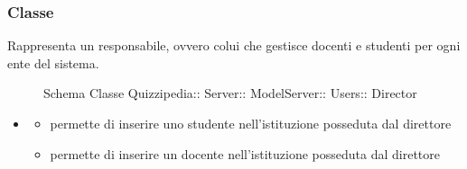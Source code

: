 \subsubsection{Classe }
Rappresenta un responsabile, ovvero colui che gestisce docenti e studenti per ogni ente del sistema.
\begin{figure}[H]
\centering
\noindent{}
\caption[Schema Classe Director]{Schema Classe Quizzipedia:: Server:: ModelServer:: Users:: Director}
\end{figure}
\begin{itemize}
\item {}
\begin{itemize}
\item {}
\newline
permette di inserire uno studente nell'istituzione posseduta dal direttore
\newline
\item {}
\newline
permette di inserire un docente nell'istituzione posseduta dal direttore
\newline
\end{itemize}
\end{itemize}
